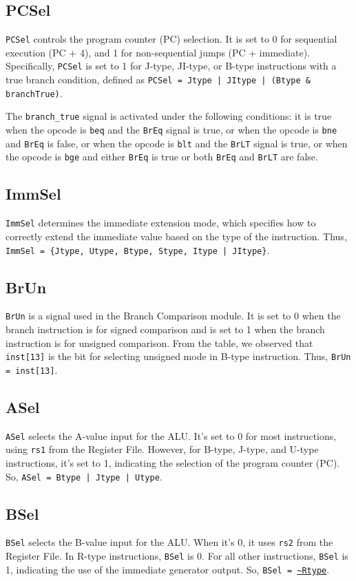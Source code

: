 \documentclass[12pt,a4paper,oneside]{book} %
\begin{document}
\subsection*{PCSel}
\texttt{PCSel} controls the program counter (PC) selection. It is set to 0 for sequential execution (PC + 4), and 1 for non-sequential jumps (PC + immediate). Specifically, \texttt{PCSel} is set to 1 for J-type, JI-type, or B-type instructions with a true branch condition, defined as \texttt{PCSel = Jtype | JItype | (Btype \& branchTrue)}.

The \texttt{branch\_true} signal is activated under the following conditions: it is true when the opcode is \texttt{beq} and the \texttt{BrEq} signal is true, or when the opcode is \texttt{bne} and \texttt{BrEq} is false, or when the opcode is \texttt{blt} and the \texttt{BrLT} signal is true, or when the opcode is \texttt{bge} and either \texttt{BrEq} is true or both \texttt{BrEq} and \texttt{BrLT} are false.

\subsection*{ImmSel}
\texttt{ImmSel} determines the immediate extension mode, which specifies how to correctly extend the immediate value based on the type of the instruction. Thus, \texttt{ImmSel = \{Jtype, Utype, Btype, Stype, Itype | JItype\}}.

\subsection*{BrUn}
\texttt{BrUn} is a signal used in the Branch Comparison module. It is set to 0 when the branch instruction is for signed comparison and is set to 1 when the branch instruction is for unsigned comparison. From the table, we observed that \texttt{inst[13]} is the bit for selecting unsigned mode in B-type instruction. Thus, \texttt{BrUn = inst[13]}.

\subsection*{ASel}
\texttt{ASel} selects the A-value input for the ALU. It's set to 0 for most instructions, using \texttt{rs1} from the Register File. However, for B-type, J-type, and U-type instructions, it's set to 1, indicating the selection of the program counter (PC). So, \texttt{ASel = Btype | Jtype | Utype}.

\subsection*{BSel}
\texttt{BSel} selects the B-value input for the ALU. When it's 0, it uses \texttt{rs2} from the Register File. In R-type instructions, \texttt{BSel} is 0. For all other instructions, \texttt{BSel} is 1, indicating the use of the immediate generator output. So, \texttt{BSel = \url{~Rtype}}.
\end{document}
